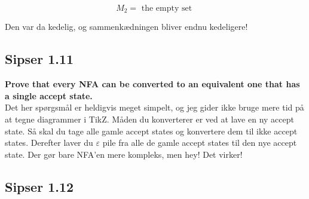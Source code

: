 \[ M_{2} = \text{ the empty set } \]
\begin{center}
\end{center}

Den var da kedelig, og sammenkædningen bliver endnu kedeligere!

\begin{center}
\end{center}

\subsection{Sipser 1.11}%
\label{subsec:sipser1.11}

\textbf{Prove that every NFA can be converted to an equivalent one that has a single accept state.}\\

Det her spørgsmål er heldigvis meget simpelt, og jeg gider ikke bruge mere tid på at tegne diagrammer i TikZ. Måden du konverterer er ved at lave en ny accept state. Så skal du tage alle gamle accept states og konvertere dem til ikke accept states. Derefter laver du $\varepsilon$ pile fra alle de gamle accept states til den nye accept state. Der gør bare NFA'en mere kompleks, men hey! Det virker!

\subsection{Sipser 1.12}%
\label{subsec:sipser1.12}

